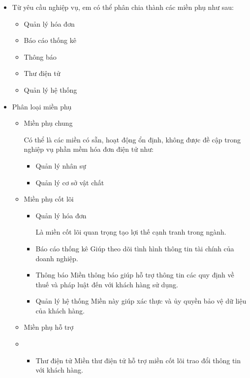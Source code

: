 \begin{itemize}

\item Từ yêu cầu nghiệp vụ, em có thể phân chia thành các miền phụ như sau:

\begin{itemize}

\item Quản lý hóa đơn

\item Báo cáo thống kê

\item Thông báo

\item Thư điện tử

\item Quản lý hệ thống

\end{itemize}

\item Phân loại miền phụ

\begin{itemize}

\item Miền phụ chung

Có thể là các miền có sẵn, hoạt động ổn định, không được đề cập trong nghiệp vụ phần mềm hóa đơn điện tử như:

\begin{itemize}

\item Quản lý nhân sự

\item Quản lý cơ sở vật chất

\end{itemize}

\item Miền phụ cốt lõi

\begin{itemize}

\item Quản lý hóa đơn

Là miền  cốt lõi quan trọng  tạo lợi thế cạnh tranh trong   ngành.
\item Báo cáo thống kê
Giúp theo dõi tình hình thông tin  tài chính   của doanh nghiệp. 

\item Thông báo
Miền thông báo giúp  hỗ trợ  thông tin các quy định về thuế và pháp luật đến với khách hàng sử dụng.


\item Quản lý hệ thống
Miền này giúp xác thực và ủy quyền bảo vệ dữ liệu của  khách hàng.
\end{itemize}

\item Miền phụ hỗ trợ

\item \begin{itemize}

\item Thư điện tử
Miền thư điện tử  hỗ trợ miền cốt lõi trao đổi thông tin với khách hàng.

\end{itemize}

\end{itemize}

\end{itemize}

